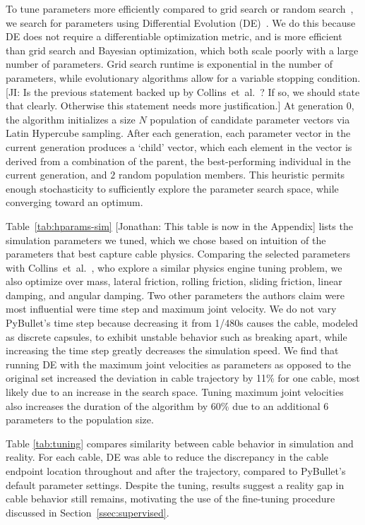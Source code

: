 \documentclass[letterpaper, 10 pt, conference]{ieeeconf}  %
\newcommand{\remark}[3]{{\color{#2}[#1: #3]}}
\newcommand{\jonathan}[1]{\remark{Jonathan}{cyan}{#1}}
\newcommand{\jeffi}[1]{\remark{JI}{red}{#1}}
\begin{document}
To tune parameters more efficiently compared to grid search or random search~\cite{random_search_2012}, we search for parameters using Differential Evolution (DE)~\cite{de_tuning_2020}. We do this because DE does not require a differentiable optimization metric, and is more efficient than grid search and Bayesian optimization, which both scale poorly with a large number of parameters. Grid search runtime is exponential in the number of parameters, while evolutionary algorithms allow for a variable stopping condition. \jeffi{Is the previous statement backed up by Collins~et~al.~\cite{de_tuning_2020}?  If so, we should state that clearly.  Otherwise this statement needs more justification.} At generation $0$, the algorithm initializes a size $N$ population of candidate parameter vectors via Latin Hypercube sampling. After each generation, each parameter vector in the current generation produces a `child' vector, which each element in the vector is derived from a combination of the parent, the best-performing individual in the current generation, and $2$ random population members. This heuristic permits enough stochasticity to sufficiently explore the parameter search space, while converging toward an optimum.

Table~\ref{tab:hparams-sim} \jonathan{This table is now in the Appendix} lists the simulation parameters we tuned, which we chose based on intuition of the parameters that best capture cable physics. Comparing the selected parameters with Collins~et~al.~\cite{de_tuning_2020}, who explore a similar physics engine tuning problem, we also optimize over mass, lateral friction, rolling friction, sliding friction, linear damping, and angular damping. Two other parameters the authors claim were most influential were time step and maximum joint velocity. We do not vary PyBullet's time step because decreasing it from 1/480s causes the cable, modeled as discrete capsules, to exhibit unstable behavior such as breaking apart, while increasing the time step greatly decreases the simulation speed. We find that running DE with the maximum joint velocities as parameters as opposed to the original set increased the deviation in cable trajectory by 11\% for one cable, most likely due to an increase in the search space. Tuning maximum joint velocities also increases the duration of the algorithm by 60\% due to an additional 6 parameters to the population size.

Table \ref{tab:tuning} compares similarity between cable behavior in simulation and reality. For each cable, DE was able to reduce the discrepancy in the cable endpoint location throughout and after the trajectory, compared to PyBullet's default parameter settings. Despite the tuning, results suggest a reality gap in cable behavior still remains, motivating the use of the fine-tuning procedure discussed in Section~\ref{ssec:supervised}.
\end{document}
